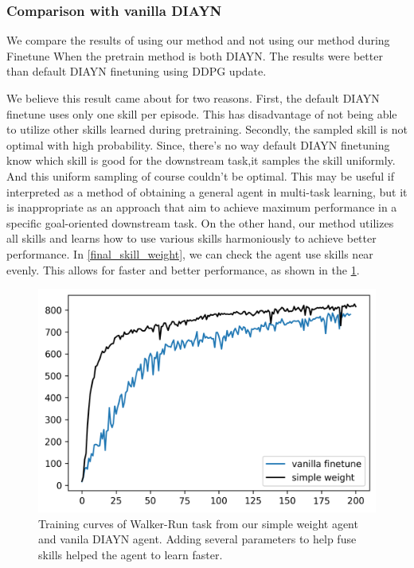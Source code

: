\subsubsection{Comparison with vanilla DIAYN}
We compare the results of using our method and not using our method during Finetune When the pretrain method is both DIAYN.
The results were better than default DIAYN finetuning using DDPG update.

We believe this result came about for two reasons.
First, the default DIAYN finetune uses only one skill per episode.
This has disadvantage of not being able to utilize other skills learned during pretraining.
Secondly, the sampled skill is not optimal with high probability.
Since, there's no way default DIAYN finetuning know which skill is good for the downstream task,it samples the skill uniformly.
And this uniform sampling of course couldn't be optimal.
This may be useful if interpreted as a method of obtaining a general agent in multi-task learning,
but it is inappropriate as an approach that aim to achieve maximum performance in a specific goal-oriented downstream task.
On the other hand, our method utilizes all skills and learns how to use various skills harmoniously to achieve better performance.
In \cref*{final_skill_weight}, we can check the agent use skills near evenly.
This allows for faster and better performance, as shown in the \cref{walker-run-simple-weight}.

\begin{figure}[ht]
  \vskip 0.2in
  \begin{center}
  \centerline{\includegraphics[width=\columnwidth]{Figures/walker_run_simple_weight.png}}
  \caption{Training curves of Walker-Run task from our simple weight agent and vanila DIAYN agent.
  Adding several parameters to help fuse skills helped the agent to learn faster.}
  \label{walker-run-simple-weight}
  \end{center}
  \vskip -0.2in
  \end{figure}


